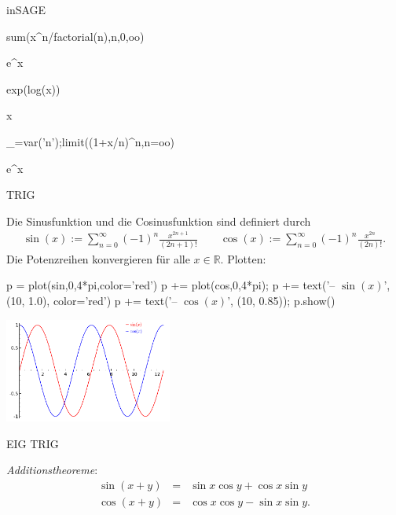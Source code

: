 \documentclass[fontsize=12pt,paper=a4,twoside,bibtotoc,idxtotoc,
liststotoc,pagesize,BCOR1.2cm,DIV15,chapterprefix,pagesize=pdftex]{scrbook}
\theoremstyle{plain}
\theoremstyle{definition}
\theoremstyle{remark}
\begin{document}
inSAGE

\begin{sagein}
sum(x^n/factorial(n),n,0,oo)
\end{sagein}
\begin{sage}
  e^x
\end{sage}
\begin{sagein}
exp(log(x))
\end{sagein}
\begin{sage}
  x
\end{sage}
\begin{sagein}
_=var('n');limit((1+x/n)^n,n=oo)
\end{sagein}
\begin{sage}
  e^x
\end{sage}
%   

TRIG

Die {\color{red} Sinusfunktion} und die {\color{red} Cosinusfunktion} sind definiert
durch
\begin{eqnarray*}
\sin(x) := \sum_{n=0}^\infty (-1)^n \frac{x^{2n+1}}{(2n+1)!} \quad\quad
\cos(x) := \sum_{n=0}^\infty (-1)^n \frac{x^{2n}}{(2n)!}. 
\end{eqnarray*}
Die Potenzreihen konvergieren für alle $x \in \mathbb{R}$. Plotten:
\begin{sagein}
p = plot(sin,0,4*pi,color='red')
p += plot(cos,0,4*pi); 
p += text('-- $\sin(x)$', (10, 1.0), color='red')
p += text('-- $\cos(x)$', (10, 0.85)); p.show()
\end{sagein}
\begin{center}
\includegraphics[width=5.5cm]{sincos.pdf}
\end{center}

EIG TRIG


 \emph{Additionstheoreme}:
\begin{eqnarray*}
\sin(x+y) & = &\sin x \cos y+ \cos x \sin y \\
\cos(x+y) & = &\cos x \cos y - \sin x \sin y .
\end{eqnarray*} 
 
\end{document}
